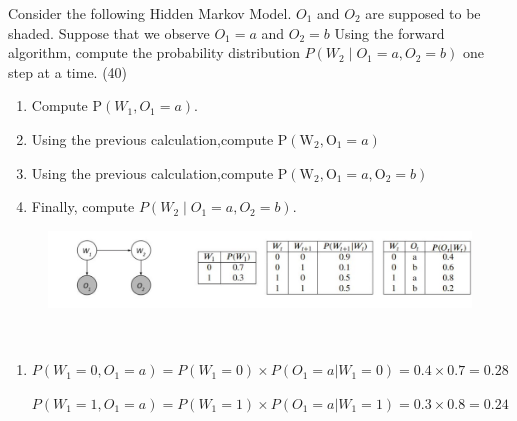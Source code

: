\begin{exercise}[HMM]{ Consider the following Hidden Markov Model. $O_1$ and $O_2$ are supposed to be shaded.  Suppose that we observe $O_{1}=a$ and $O_{2}=b$ Using the forward algorithm, compute the probability distribution $P\left(W_{2} \mid O_{1}=a, O_{2}=b\right)$ one step at a time. (40)
    \begin{enumerate}
        \item Compute $\mathrm{P}\left(W_{1}, O_{1}=a\right)$.
        \item Using the previous calculation,compute $\mathrm{P}\left(\mathrm{W}_{2}, \mathrm{O}_{1}=a\right)$
        \item Using the previous calculation,compute $\mathrm{P}\left(\mathrm{W}_{2}, \mathrm{O}_{1}=a, \mathrm{O}_{2}=b\right)$
        \item Finally, compute $P\left(W_{2} \mid O_{1}=a, O_{2}=b\right)$.
    \end{enumerate}

    \begin{figure}[h]
        \centering
        \includegraphics[width=12cm]{img/ex3-4.jpg}
    \end{figure}
        }
  \begin{solution}
  \par{~}
  \begin{enumerate}
    \item $P(W_1 = 0, O_1 = a) = P(W_1 = 0) \times P(O_1 = a | W_1 = 0) = 0.4 \times 0.7 = 0.28$
    
    $P(W_1 = 1, O_1 = a) = P(W_1 = 1) \times P(O_1 = a | W_1 = 1) = 0.3 \times 0.8 = 0.24$


\end{enumerate}
\end{solution}
\end{exercise}
